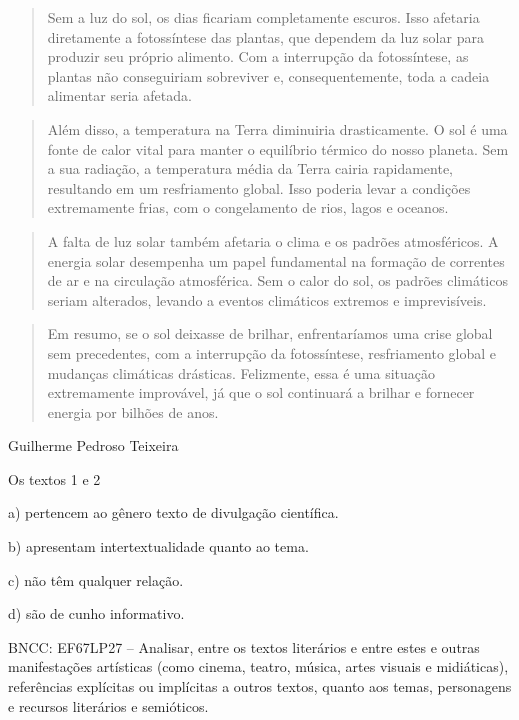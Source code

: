 \begin{quote}
Sem a luz do sol, os dias ficariam completamente escuros. Isso afetaria
diretamente a fotossíntese das plantas, que dependem da luz solar para
produzir seu próprio alimento. Com a interrupção da fotossíntese, as
plantas não conseguiriam sobreviver e, consequentemente, toda a cadeia
alimentar seria afetada.
\end{quote}

\begin{quote}
Além disso, a temperatura na Terra diminuiria drasticamente. O sol é uma
fonte de calor vital para manter o equilíbrio térmico do nosso planeta.
Sem a sua radiação, a temperatura média da Terra cairia rapidamente,
resultando em um resfriamento global. Isso poderia levar a condições
extremamente frias, com o congelamento de rios, lagos e oceanos.
\end{quote}

\begin{quote}
A falta de luz solar também afetaria o clima e os padrões atmosféricos.
A energia solar desempenha um papel fundamental na formação de correntes
de ar e na circulação atmosférica. Sem o calor do sol, os padrões
climáticos seriam alterados, levando a eventos climáticos extremos e
imprevisíveis.
\end{quote}

\begin{quote}
Em resumo, se o sol deixasse de brilhar, enfrentaríamos uma crise global
sem precedentes, com a interrupção da fotossíntese, resfriamento global
e mudanças climáticas drásticas. Felizmente, essa é uma situação
extremamente improvável, já que o sol continuará a brilhar e fornecer
energia por bilhões de anos.
\end{quote}

Guilherme Pedroso Teixeira

Os textos 1 e 2

a) pertencem ao gênero texto de divulgação científica.

b) apresentam intertextualidade quanto ao tema.

c) não têm qualquer relação.

d) são de cunho informativo.

BNCC: EF67LP27 -- Analisar, entre os textos literários e entre estes e
outras manifestações artísticas (como cinema, teatro, música, artes
visuais e midiáticas), referências explícitas ou implícitas a outros
textos, quanto aos temas, personagens e recursos literários e
semióticos.

